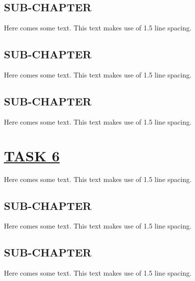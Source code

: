\documentclass[fontsize=11pt]{scrartcl}
\begin{document}
\subsection{SUB-CHAPTER}
Here comes some text. This text makes use of 1.5 line spacing. 
\subsection{SUB-CHAPTER}
Here comes some text. This text makes use of 1.5 line spacing. 
\subsection{SUB-CHAPTER}
Here comes some text. This text makes use of 1.5 line spacing. 
\pagebreak
\section{\uline{TASK 6}}
Here comes some text. This text makes use of 1.5 line spacing. 
\subsection{SUB-CHAPTER}
Here comes some text. This text makes use of 1.5 line spacing. 
\subsection{SUB-CHAPTER}
Here comes some text. This text makes use of 1.5 line spacing. 
\end{document}
